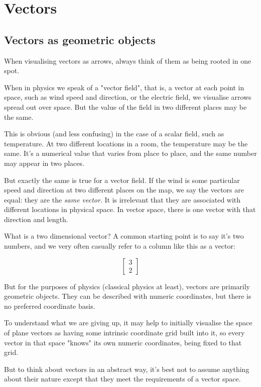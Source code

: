 \chapter {Vectors}

\section{Vectors as geometric objects}

When visualising vectors as arrows, always think of them as being rooted in one spot.

When in physics we speak of a "vector field", that is, a vector at each point in space, such as wind speed and direction, or the electric field, we visualise arrows spread out over space. But the value of the field in two different places may be the same.

This is obvious (and less confusing) in the case of a scalar field, such as temperature. At two different locations in a room, the temperature may be the same. It's a numerical value that varies from place to place, and the same number may appear in two places.

But exactly the same is true for a vector field. If the wind is some particular speed and direction at two different places on the map, we say the vectors are equal: they are the \textit{same vector}. It is irrelevant that they are associated with different locations in physical space. In vector space, there is one vector with that direction and length.

What is a two dimensional vector? A common starting point is to say it's two numbers, and we very often casually refer to a column like this as a vector:

$$
\begin{bmatrix}3 \\ 2\end{bmatrix}
$$

But for the purposes of physics (classical physics at least), vectors are primarily geometric objects. They can be described with numeric coordinates, but there is no preferred coordinate basis.

To understand what we are giving up, it may help to initially visualise the space of plane vectors as having some intrinsic coordinate grid built into it, so every vector in that space "knows" its own numeric coordinates, being fixed to that grid.

But to think about vectors in an abstract way, it's best not to assume anything about their nature except that they meet the requirements of a vector space.


